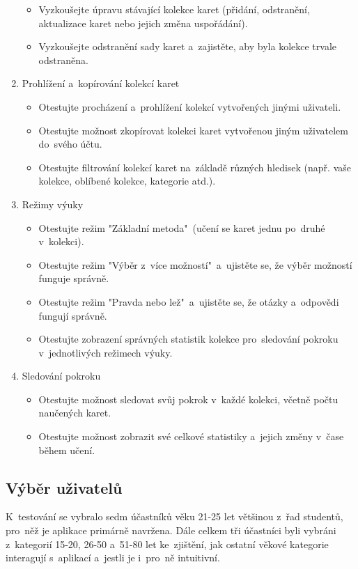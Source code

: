 \documentclass[twoside]{ctuthesis}
\begin{document}
\begin{enumerate}
\begin{itemize}[label=\textbullet]
\item Vyzkoušejte úpravu stávající kolekce karet (přidání, odstranění, aktualizace karet nebo jejich změna uspořádání).
\item Vyzkoušejte odstranění sady karet a~zajistěte, aby byla kolekce trvale odstraněna.
\end{itemize}
\item Prohlížení a~kopírování kolekcí karet
\begin{itemize}[label=\textbullet]
\item Otestujte procházení a~prohlížení kolekcí vytvořených jinými uživateli.
\item Otestujte možnost zkopírovat kolekci karet vytvořenou jiným uživatelem do~svého účtu.
\item Otestujte filtrování kolekcí karet na~základě různých hledisek (např. vaše kolekce, oblíbené kolekce, kategorie atd.).
\end{itemize}
\item Režimy výuky
\begin{itemize}[label=\textbullet]
\item Otestujte režim "Základní metoda"~(učení se karet jednu po~druhé v~kolekci).
\item Otestujte režim "Výběr z~více možností"~a~ujistěte se, že výběr možností funguje správně.
\item Otestujte režim "Pravda nebo lež"~a~ujistěte se, že otázky a~odpovědi fungují správně.
\item Otestujte zobrazení správných statistik kolekce pro~sledování pokroku v~jednotlivých režimech výuky.
\end{itemize}
\item Sledování pokroku
\begin{itemize}[label=\textbullet]
\item Otestujte možnost sledovat svůj pokrok v~každé kolekci, včetně počtu naučených karet.
\item Otestujte možnost zobrazit své celkové statistiky a~jejich změny v~čase během učení.
\end{itemize}
\end{enumerate}

\subsection{Výběr uživatelů}

K~testování se vybralo sedm účastníků věku 21-25 let většinou z~řad studentů, pro~něž je aplikace primárně navržena. Dále celkem tři účastníci byli vybráni z~kategorií 15-20, 26-50 a~51-80 let ke~zjištění, jak ostatní věkové kategorie interagují s~aplikací a~jestli je i~pro~ně intuitivní.
\end{document}
